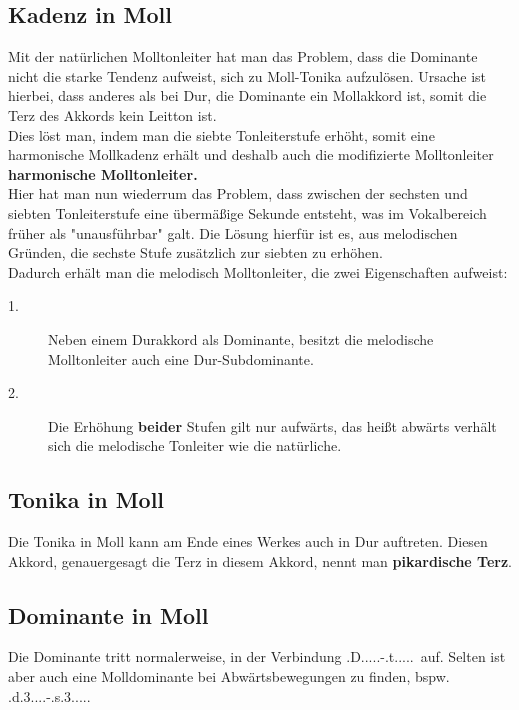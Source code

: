 \documentclass[a4paper]{article}
\newcommand{\D}{\HH.D.....}
\newcommand{\Tm}{\HH.t.....}
\newcommand{\SSm}{\HH.s.3....}
\newcommand{\DSem}{\HH.d.3....}
\begin{document}
	\subsection{Kadenz in Moll}
	Mit der natürlichen Molltonleiter hat man das Problem, dass die Dominante nicht die starke Tendenz aufweist, sich zu Moll-Tonika aufzulösen. Ursache ist hierbei, dass anderes als bei Dur, die Dominante ein Mollakkord ist, somit die Terz des Akkords kein Leitton ist.\\
	Dies löst man, indem man die siebte Tonleiterstufe erhöht, somit eine harmonische Mollkadenz erhält und deshalb auch die modifizierte Molltonleiter \textbf{harmonische Molltonleiter.}\\
	Hier hat man nun wiederrum das Problem, dass zwischen der sechsten und siebten Tonleiterstufe eine übermäßige Sekunde entsteht, was im Vokalbereich früher als "{}unausführbar" galt. Die Lösung hierfür ist es, aus melodischen Gründen, die sechste Stufe zusätzlich zur siebten zu erhöhen.\\
	Dadurch erhält man die melodisch Molltonleiter, die zwei Eigenschaften aufweist:
	\begin{description}
		\item[1.] Neben einem Durakkord als Dominante, besitzt die melodische Molltonleiter auch eine Dur-Subdominante.
		\item[2.] Die Erhöhung \textbf{beider} Stufen gilt nur aufwärts, das heißt abwärts verhält sich die melodische Tonleiter wie die natürliche.
	\end{description}

	\subsection{Tonika in Moll}
	Die Tonika in Moll kann am Ende eines Werkes auch in Dur auftreten. Diesen Akkord, genauergesagt die Terz in diesem Akkord, nennt man \textbf{pikardische Terz}. 
	
	\subsection{Dominante in Moll}
	Die Dominante tritt normalerweise, in der Verbindung \D-\Tm\  auf. Selten ist aber auch eine Molldominante bei Abwärtsbewegungen zu finden, bspw. \DSem-\SSm.
	
\end{document}
